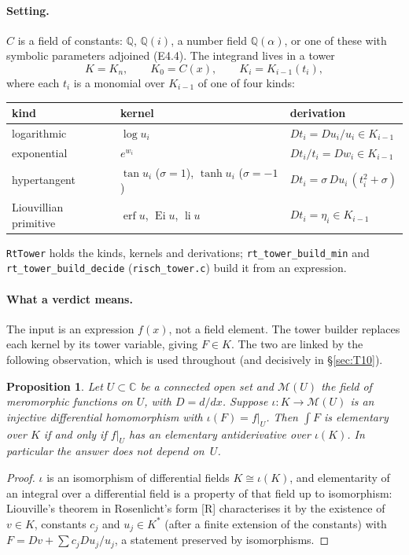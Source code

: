 \documentclass[11pt]{article}
\newtheorem{proposition}[theorem]{Proposition}
\theoremstyle{definition}
\theoremstyle{remark}
\newcommand{\Q}{\mathbb{Q}}
\newcommand{\C}{\mathbb{C}}
\newcommand{\code}[1]{\texttt{#1}}
\begin{document}
\paragraph{Setting.} $C$ is a field of constants: $\Q$, $\Q(i)$, a number field
$\Q(\alpha)$, or one of these with symbolic parameters adjoined (E4.4). The integrand
lives in a tower
\[ K=K_n,\qquad K_0=C(x),\qquad K_i=K_{i-1}(t_i), \]
where each $t_i$ is a monomial over $K_{i-1}$ of one of four kinds:
\begin{center}
\begin{tabular}{lll}
\toprule
kind & kernel & derivation \\
\midrule
logarithmic & $\log u_i$ & $Dt_i=Du_i/u_i\in K_{i-1}$\\
exponential & $e^{w_i}$ & $Dt_i/t_i=Dw_i\in K_{i-1}$\\
hypertangent & $\tan u_i$ ($\sigma=1$), $\tanh u_i$ ($\sigma=-1$) & $Dt_i=\sigma\,Du_i\,(t_i^2+\sigma)$\\
Liouvillian primitive & $\operatorname{erf}u$, $\operatorname{Ei}u$, $\operatorname{li}u$ & $Dt_i=\eta_i\in K_{i-1}$\\
\bottomrule
\end{tabular}
\end{center}
\code{RtTower} holds the kinds, kernels and derivations; \code{rt\_tower\_build\_min}
and \code{rt\_tower\_build\_decide} (\code{risch\_tower.c}) build it from an expression.

\paragraph{What a verdict means.} The input is an expression $f(x)$, not a field
element. The tower builder replaces each kernel by its tower variable, giving
$F\in K$. The two are linked by the following observation, which is used
throughout (and decisively in \S\ref{sec:T10}).

\begin{proposition}\label{prop:T0}
Let $U\subset\C$ be a connected open set and $\mathcal M(U)$ the field of meromorphic
functions on $U$, with $D=d/dx$. Suppose $\iota:K\to\mathcal M(U)$ is an injective
differential homomorphism with $\iota(F)=f|_U$. Then $\int F$ is elementary over $K$
if and only if $f|_U$ has an elementary antiderivative over $\iota(K)$. In particular
the answer does not depend on~$U$.
\end{proposition}

\begin{proof}
$\iota$ is an isomorphism of differential fields $K\cong\iota(K)$, and elementarity of
an integral over a differential field is a property of that field up to isomorphism:
Liouville's theorem in Rosenlicht's form [R] characterises it by the existence of
$v\in K$, constants $c_j$ and $u_j\in K^*$ (after a finite extension of the constants)
with $F=Dv+\sum c_jDu_j/u_j$, a statement preserved by isomorphisms.
\end{proof}
\end{document}
